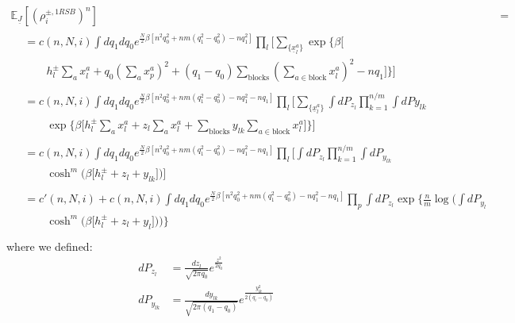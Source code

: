 \documentclass{article}
\begin{document}
\begin{align}
\mathbb{E}_{\underline{J}} \left[(\rho_i^{\pm, 1RSB})^n \right] &=&  \\[1ex]
\begin{split}
& = c(n,N,i) \int dq_1 dq_0 e^{\frac{N}{2}\beta\left[n^2 q_0^2 + nm(q_1^2 - q_0^2) -n q_1^2\right]} 
\prod_{l} \biggl[ \sum_{\{\underline{x}^{a}_l\}} \exp\biggl\{\beta \bigl[ \\ 
 & \qquad h_l^{\pm} \sum_{a} x_l^{a} +q_0 \left( \sum_{a} x_p^{a} \right)^2 + (q_1-q_0) \sum_{\text{blocks}} \left( \sum_{a \in \text{block}}x_l^{a}\right)^2  -nq_1 \bigl]  \biggr\}  \biggr] 
\end{split}\\ 
\begin{split}
& = c(n,N,i) \int dq_1 dq_0 e^{\frac{N}{2}\beta\left[n^2 q_0^2 + nm(q_1^2 - q_0^2) -n q_1^2 -n q_1\right]} 
\prod_{l} \biggl[ \sum_{\{\underline{x}^{a}_l\}} \int dP_{z_l} \prod_{k=1}^{n/m} \int dP{y_{lk}} \\ 
 &  \qquad  \exp\biggl\{\beta \bigl[h_l^{\pm} \sum_{a} x_l^{a} +  z_l \sum_{a}x_l^{a} + \sum_{\text{blocks}}  y_{lk} \sum_{a \in \text{block}}x_l^{a}\bigl]  \biggr\}  \biggr] 
\end{split}\\ 
\begin{split}
& = c(n,N,i) \int dq_1 dq_0 e^{\frac{N}{2}\beta\left[n^2 q_0^2 + nm(q_1^2 - q_0^2) -n q_1^2 -n q_1\right]} 
\prod_{l} \biggl[ \int dP_{z_l}  \prod_{k=1}^{n/m} \int dP_{y_{lk}}\\ 
 &  \qquad  \cosh^m\biggl(\beta \bigl[h_l^{\pm}+  z_l +y_{lk}\bigl]  \biggr)  \biggr]
\end{split}\\ 
\begin{split}
& = c'(n,N,i) + c(n,N,i) \int dq_1 dq_0 e^{\frac{N}{2}\beta\left[n^2 q_0^2 + nm(q_1^2 - q_0^2) -n q_1^2 -n q_1\right]} 
\prod_{p} \int dP_{z_l}  \exp \biggl\{ \frac{n}{m} \log \biggl( \int dP_{y_{l}}\\ 
 &  \qquad  \cosh^m\biggl(\beta \bigl[h_l^{\pm}+ z_l + y_{l}\bigl]  \biggr)  \biggr) \biggr\}
\end{split}\\ 
\end{align}
where we defined:
\begin{align}
    dP_{z_l} & = \frac{dz_l}{\sqrt{2\pi q_0}}e^{\frac{z^2}{2q_0}}\\
    dP_{y_{lk}} & = \frac{dy_{lk}}{\sqrt{2\pi (q_1-q_0)}}e^{\frac{y_{lk}^2}{2 (q_i-q_0)}}
\end{align}
\end{document}
